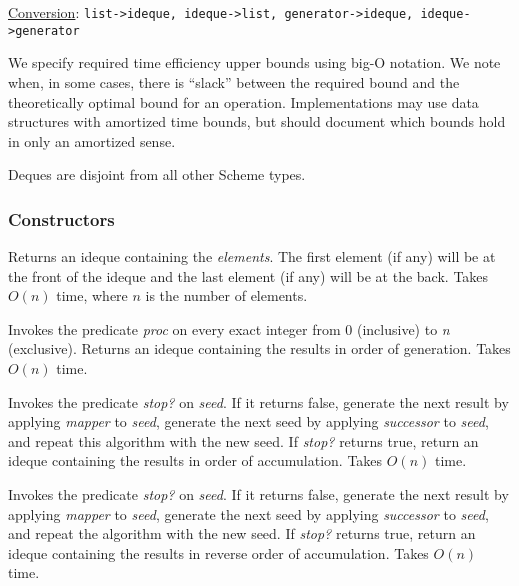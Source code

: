 \protect\hyperlink{Conversion}{Conversion}:
\texttt{list-\textgreater{}ideque,\ ideque-\textgreater{}list,\ generator-\textgreater{}ideque,\ ideque-\textgreater{}generator}


We specify required time efficiency upper bounds using big-O notation.
We note when, in some cases, there is ``slack'' between the required
bound and the theoretically optimal bound for an operation.
Implementations may use data structures with amortized time bounds, but
should document which bounds hold in only an amortized sense.

Deques are disjoint from all other Scheme types.

\subsubsection{Constructors}

\begin{entry}{%
  }

  Returns an ideque containing the \emph{elements}. The first element
  (if any) will be at the front of the ideque and the last element (if
  any) will be at the back. Takes $O(n)$ time, where $n$ is the
  number of elements.
\end{entry}

\begin{entry}{%
  }

  Invokes the predicate \emph{proc} on every exact integer from 0
  (inclusive) to \emph{n} (exclusive). Returns an ideque containing
  the results in order of generation. Takes $O(n)$ time.
\end{entry}

\begin{entry}{%
  }

  Invokes the predicate \emph{stop?} on \emph{seed}. If it returns
  false, generate the next result by applying \emph{mapper} to
  \emph{seed}, generate the next seed by applying \emph{successor} to
  \emph{seed}, and repeat this algorithm with the new seed. If
  \emph{stop?} returns true, return an ideque containing the results
  in order of accumulation. Takes $O(n)$ time.
\end{entry}

\begin{entry}{%
  }

  Invokes the predicate \emph{stop?} on \emph{seed}. If it returns
  false, generate the next result by applying \emph{mapper} to
  \emph{seed}, generate the next seed by applying \emph{successor} to
  \emph{seed}, and repeat the algorithm with the new seed. If
  \emph{stop?} returns true, return an ideque containing the results
  in reverse order of accumulation. Takes $O(n)$ time.
\end{entry}

